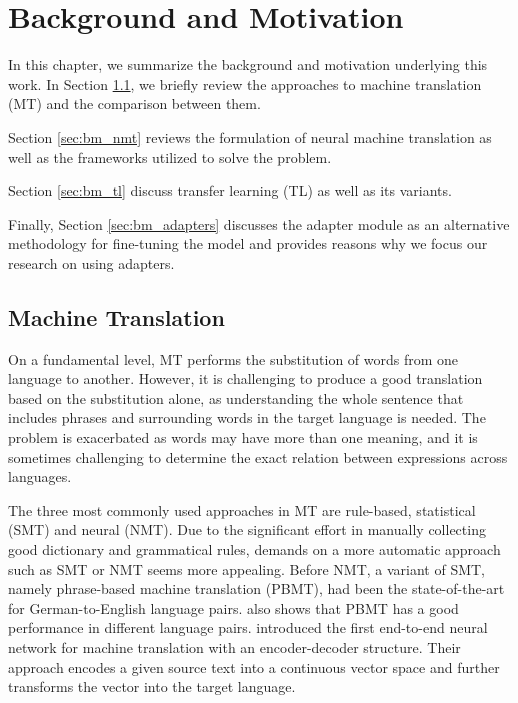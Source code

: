 \chapter{Background and Motivation}

In this chapter, we summarize the background and motivation underlying this work. In Section \ref{sec:bm_smt}, we briefly review the approaches to machine translation (MT) and the comparison between them.

Section \ref{sec:bm_nmt} reviews the formulation of neural machine translation as well as the frameworks utilized to solve the problem.


Section \ref{sec:bm_tl} discuss transfer learning (TL) as well as its variants.

Finally, Section \ref{sec:bm_adapters} discusses the adapter module as an alternative methodology for fine-tuning the model and provides reasons why we focus our research on using adapters.

\section{Machine Translation}
\label{sec:bm_smt}
On a fundamental level, MT performs the substitution of words from one language to another. However, it is challenging to produce a good translation based on the substitution alone, as understanding the whole sentence that includes phrases and surrounding words in the target language is needed. The problem is exacerbated as words may have more than one meaning, and it is sometimes challenging to determine the exact relation between expressions across languages.

The three most commonly used approaches in MT are rule-based, statistical (SMT) and neural (NMT). Due to the significant effort in manually collecting good dictionary and grammatical rules, demands on a more automatic approach such as SMT or NMT seems more appealing.
Before NMT, a variant of SMT, namely phrase-based machine translation (PBMT), had been the state-of-the-art for German-to-English language pairs. \cite{bojar2015proceeding} also shows that PBMT has a good performance in different language pairs. \cite{blunsom2013recurrent} introduced the first end-to-end neural network for machine translation with an encoder-decoder structure. Their approach encodes a given source text into a continuous vector space and further transforms the  vector into the target language.

